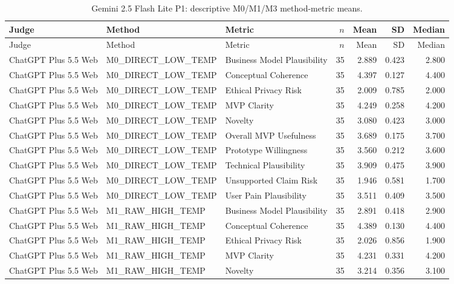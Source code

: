 \documentclass[10pt]{article}
\begin{document}
\begin{landscape}
\small
\begin{longtable}{lllrrrr}
\caption{Gemini 2.5 Flash Lite P1: descriptive M0/M1/M3 method-metric means.}\label{tab:s18-method25p1}\\
\toprule Judge & Method & Metric & $n$ & Mean & SD & Median \\ \midrule\endfirsthead
\toprule Judge & Method & Metric & $n$ & Mean & SD & Median \\ \midrule\endhead
\bottomrule\endfoot
ChatGPT Plus 5.5 Web & M0\_DIRECT\_LOW\_TEMP & Business Model Plausibility & 35 & 2.889 & 0.423 & 2.800 \\
ChatGPT Plus 5.5 Web & M0\_DIRECT\_LOW\_TEMP & Conceptual Coherence & 35 & 4.397 & 0.127 & 4.400 \\
ChatGPT Plus 5.5 Web & M0\_DIRECT\_LOW\_TEMP & Ethical Privacy Risk & 35 & 2.009 & 0.785 & 2.000 \\
ChatGPT Plus 5.5 Web & M0\_DIRECT\_LOW\_TEMP & MVP Clarity & 35 & 4.249 & 0.258 & 4.200 \\
ChatGPT Plus 5.5 Web & M0\_DIRECT\_LOW\_TEMP & Novelty & 35 & 3.080 & 0.423 & 3.000 \\
ChatGPT Plus 5.5 Web & M0\_DIRECT\_LOW\_TEMP & Overall MVP Usefulness & 35 & 3.689 & 0.175 & 3.700 \\
ChatGPT Plus 5.5 Web & M0\_DIRECT\_LOW\_TEMP & Prototype Willingness & 35 & 3.560 & 0.212 & 3.600 \\
ChatGPT Plus 5.5 Web & M0\_DIRECT\_LOW\_TEMP & Technical Plausibility & 35 & 3.909 & 0.475 & 3.900 \\
ChatGPT Plus 5.5 Web & M0\_DIRECT\_LOW\_TEMP & Unsupported Claim Risk & 35 & 1.946 & 0.581 & 1.700 \\
ChatGPT Plus 5.5 Web & M0\_DIRECT\_LOW\_TEMP & User Pain Plausibility & 35 & 3.511 & 0.409 & 3.500 \\
ChatGPT Plus 5.5 Web & M1\_RAW\_HIGH\_TEMP & Business Model Plausibility & 35 & 2.891 & 0.418 & 2.900 \\
ChatGPT Plus 5.5 Web & M1\_RAW\_HIGH\_TEMP & Conceptual Coherence & 35 & 4.389 & 0.130 & 4.400 \\
ChatGPT Plus 5.5 Web & M1\_RAW\_HIGH\_TEMP & Ethical Privacy Risk & 35 & 2.026 & 0.856 & 1.900 \\
ChatGPT Plus 5.5 Web & M1\_RAW\_HIGH\_TEMP & MVP Clarity & 35 & 4.231 & 0.331 & 4.200 \\
ChatGPT Plus 5.5 Web & M1\_RAW\_HIGH\_TEMP & Novelty & 35 & 3.214 & 0.356 & 3.100 \\

\end{longtable}
\end{landscape}
\end{document}
